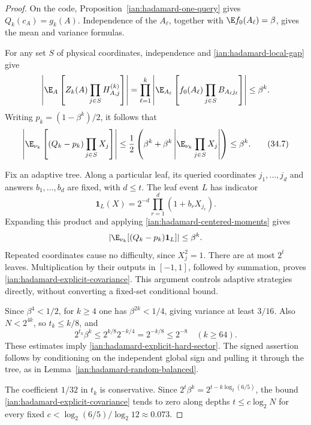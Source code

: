 \begin{proof}
On the code, Proposition~\ref{ian:hadamard-one-query} gives
\(Q_k(c_A)=g_k(A)\). Independence of the \(A_\ell\), together with
\(\E f_0(A_\ell)=\beta\), gives the mean and variance formulas.

For any set \(S\) of physical coordinates, independence and
\eqref{ian:hadamard-local-gap} give
\[
 \left|
 \E_A\left[Z_k(A)\prod_{j\in S}H^{(k)}_{A,j}\right]
 \right|
 =
 \prod_{\ell=1}^k
 \left|
 \E_{A_\ell}\left[
 f_0(A_\ell)\prod_{j\in S}B_{A_\ell j_\ell}
 \right]\right|
 \le\beta^k.
\]
Writing \(p_k=(1-\beta^k)/2\), it follows that
\[
 \left|
 \E_{\nu_k}\left[(Q_k-p_k)\prod_{j\in S}X_j\right]
 \right|
 \le\frac12\left(\beta^k+
       \beta^k\left|\E_{\nu_k}\prod_{j\in S}X_j\right|\right)
 \le\beta^k.
 \tag{34.7}\label{ian:hadamard-centered-moments}
\]

Fix an adaptive tree. Along a particular leaf, its queried coordinates
\(j_1,\ldots,j_d\) and answers \(b_1,\ldots,b_d\) are fixed, with \(d\le t\).
The leaf event \(L\) has indicator
\[
 \mathbf1_L(X)=2^{-d}\prod_{r=1}^d(1+b_rX_{j_r}).
\]
Expanding this product and applying
\eqref{ian:hadamard-centered-moments} gives
\[
 \left|\E_{\nu_k}[(Q_k-p_k)\mathbf1_L]\right|\le\beta^k.
\]
Repeated coordinates cause no difficulty, since \(X_j^2=1\).
There are at most \(2^t\) leaves. Multiplication by their outputs in
\([-1,1]\), followed by summation, proves
\eqref{ian:hadamard-explicit-covariance}. This argument controls adaptive
strategies directly, without converting a fixed-set conditional bound.

Since \(\beta^4<1/2\), for \(k\ge4\) one has
\(\beta^{2k}<1/4\), giving variance at least \(3/16\).
Also \(N<2^{4k}\), so \(t_k\le k/8\), and
\[
 2^{t_k}\beta^k
 \le2^{k/8}2^{-k/4}
 =2^{-k/8}\le2^{-8}
 \quad(k\ge64).
\]
These estimates imply \eqref{ian:hadamard-explicit-hard-sector}.
The signed assertion follows by conditioning on the independent global
sign and pulling it through the tree, as in
Lemma~\ref{ian:hadamard-random-balanced}.

The coefficient \(1/32\) in \(t_k\) is conservative. Since
\(2^t\beta^k=2^{t-k\log_2(6/5)}\), the bound
\eqref{ian:hadamard-explicit-covariance} tends to zero along depths
\(t\le c\log_2N\) for every fixed
\(c<\log_2(6/5)/\log_2 12\approx0.073\).
\end{proof}

